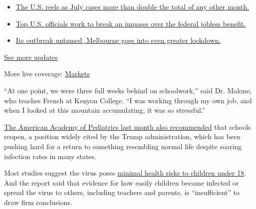 \begin{itemize}
\tightlist
\item
  \href{https://www.nytimes3xbfgragh.onion/2020/08/01/world/coronavirus-covid-19.html?action=click\&pgtype=Article\&state=default\&region=MAIN_CONTENT_1\&context=storylines_live_updates\#link-34047410}{The
  U.S. reels as July cases more than double the total of any other
  month.}
\item
  \href{https://www.nytimes3xbfgragh.onion/2020/08/01/world/coronavirus-covid-19.html?action=click\&pgtype=Article\&state=default\&region=MAIN_CONTENT_1\&context=storylines_live_updates\#link-780ec966}{Top
  U.S. officials work to break an impasse over the federal jobless
  benefit.}
\item
  \href{https://www.nytimes3xbfgragh.onion/2020/08/01/world/coronavirus-covid-19.html?action=click\&pgtype=Article\&state=default\&region=MAIN_CONTENT_1\&context=storylines_live_updates\#link-2bc8948}{Its
  outbreak untamed, Melbourne goes into even greater lockdown.}
\end{itemize}

\href{https://www.nytimes3xbfgragh.onion/2020/08/01/world/coronavirus-covid-19.html?action=click\&pgtype=Article\&state=default\&region=MAIN_CONTENT_1\&context=storylines_live_updates}{See
more updates}

More live coverage:
\href{https://www.nytimes3xbfgragh.onion/live/2020/07/31/business/stock-market-today-coronavirus?action=click\&pgtype=Article\&state=default\&region=MAIN_CONTENT_1\&context=storylines_live_updates}{Markets}

``At one point, we were three full weeks behind on schoolwork,'' said
Dr. Malone, who teaches French at Kenyon College. ``I was working
through my own job, and when I looked at this mountain accumulating, it
was so stressful.''

\href{https://www.nytimes3xbfgragh.onion/2020/06/30/us/coronavirus-schools-reopening-guidelines-aap.html}{The
American Academy of Pediatrics last month also recommended} that schools
reopen, a position widely cited by the Trump administration, which has
been pushing hard for a return to something resembling normal life
despite soaring infection rates in many states.

Most studies suggest the virus poses
\href{https://www.nytimes3xbfgragh.onion/2020/07/11/health/coronavirus-schools-reopen.html}{minimal
health risks to children under 18}. And the report said that evidence
for how easily children become infected or spread the virus to others,
including teachers and parents, is ``insufficient'' to draw firm
conclusions.

